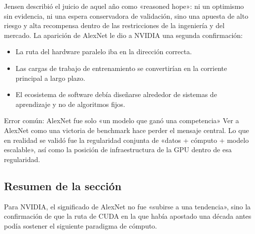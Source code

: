 Jensen describió el juicio de aquel año como «reasoned hope»: ni un optimismo sin evidencia, ni una espera conservadora de validación, sino una apuesta de alto riesgo y alta recompensa dentro de las restricciones de la ingeniería y del mercado. La aparición de AlexNet le dio a NVIDIA una segunda confirmación:
\begin{itemize}
    \item La ruta del hardware paralelo iba en la dirección correcta.
    \item Las cargas de trabajo de entrenamiento se convertirían en la corriente principal a largo plazo.
    \item El ecosistema de software debía diseñarse alrededor de sistemas de aprendizaje y no de algoritmos fijos.
\end{itemize}

\begin{warningbox}{Error común: AlexNet fue solo «un modelo que ganó una competencia»}
Ver a AlexNet como una victoria de benchmark hace perder el mensaje central. Lo que en realidad se validó fue la regularidad conjunta de «datos + cómputo + modelo escalable», así como la posición de infraestructura de la GPU dentro de esa regularidad.
\end{warningbox}

\subsection{Resumen de la sección}
Para NVIDIA, el significado de AlexNet no fue «subirse a una tendencia», sino la confirmación de que la ruta de CUDA en la que había apostado una década antes podía sostener el siguiente paradigma de cómputo.

